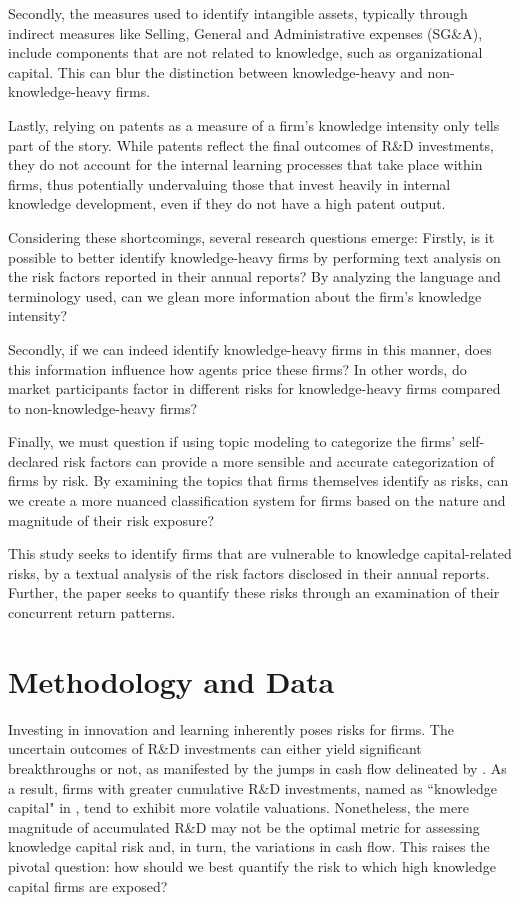 \documentclass[12pt, letterpaper]{article}
\begin{document}
Secondly, the measures used to identify intangible assets, typically through indirect measures like Selling, General and Administrative expenses (SG\&A), include components that are not related to knowledge, such as organizational capital. This can blur the distinction between knowledge-heavy and non-knowledge-heavy firms.

Lastly, relying on patents as a measure of a firm's knowledge intensity only tells part of the story. While patents reflect the final outcomes of R\&D investments, they do not account for the internal learning processes that take place within firms, thus potentially undervaluing those that invest heavily in internal knowledge development, even if they do not have a high patent output.

Considering these shortcomings, several research questions emerge: Firstly, is it possible to better identify knowledge-heavy firms by performing text analysis on the risk factors reported in their annual reports? By analyzing the language and terminology used, can we glean more information about the firm's knowledge intensity?

Secondly, if we can indeed identify knowledge-heavy firms in this manner, does this information influence how agents price these firms? In other words, do market participants factor in different risks for knowledge-heavy firms compared to non-knowledge-heavy firms?

Finally, we must question if using topic modeling to categorize the firms' self-declared risk factors can provide a more sensible and accurate categorization of firms by risk. By examining the topics that firms themselves identify as risks, can we create a more nuanced classification system for firms based on the nature and magnitude of their risk exposure?

This study seeks to identify firms that are vulnerable to knowledge capital-related risks, by a textual analysis of the risk factors disclosed in their annual reports. Further, the paper seeks to quantify these risks through an examination of their concurrent return patterns.

\section{Methodology and Data}

Investing in innovation and learning inherently poses risks for firms. The uncertain outcomes of R\&D investments can either yield significant breakthroughs or not, as manifested by the jumps in cash flow delineated by \citet{Andrei2019-bh}. As a result, firms with greater cumulative R\&D investments, named as ``knowledge capital" in \cite{Belo2019-iz}, tend to exhibit more volatile valuations. Nonetheless, the mere magnitude of accumulated R\&D may not be the optimal metric for assessing knowledge capital risk and, in turn, the variations in cash flow. This raises the pivotal question: how should we best quantify the risk to which high knowledge capital firms are exposed?
\end{document}
